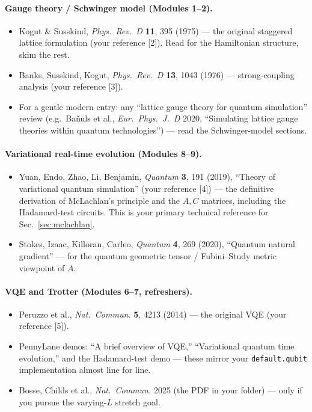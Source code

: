 \documentclass[11pt,a4paper]{article}
\begin{document}
\paragraph{Gauge theory / Schwinger model (Modules 1--2).}
\begin{itemize}[nosep,leftmargin=1.4em]
\item Kogut \& Susskind, \emph{Phys.\ Rev.\ D} \textbf{11}, 395 (1975) --- the original staggered
lattice formulation (your reference [2]). Read for the Hamiltonian structure, skim the rest.
\item Banks, Susskind, Kogut, \emph{Phys.\ Rev.\ D} \textbf{13}, 1043 (1976) --- strong-coupling
analysis (your reference [3]).
\item For a gentle modern entry: any ``lattice gauge theory for quantum simulation'' review (e.g.\
Ba\~nuls et al., \emph{Eur.\ Phys.\ J.\ D} 2020, ``Simulating lattice gauge theories within quantum
technologies'') --- read the Schwinger-model sections.
\end{itemize}

\paragraph{Variational real-time evolution (Modules 8--9).}
\begin{itemize}[nosep,leftmargin=1.4em]
\item Yuan, Endo, Zhao, Li, Benjamin, \emph{Quantum} \textbf{3}, 191 (2019), ``Theory of variational
quantum simulation'' (your reference [4]) --- the definitive derivation of McLachlan's principle and
the $A,C$ matrices, including the Hadamard-test circuits. This is your primary technical reference for
Sec.~\ref{sec:mclachlan}.
\item Stokes, Izaac, Killoran, Carleo, \emph{Quantum} \textbf{4}, 269 (2020), ``Quantum natural
gradient'' --- for the quantum geometric tensor / Fubini--Study metric viewpoint of $A$.
\end{itemize}

\paragraph{VQE and Trotter (Modules 6--7, refreshers).}
\begin{itemize}[nosep,leftmargin=1.4em]
\item Peruzzo et al., \emph{Nat.\ Commun.} \textbf{5}, 4213 (2014) --- the original VQE (your
reference [5]).
\item PennyLane demos: ``A brief overview of VQE,'' ``Variational quantum time evolution,'' and the
Hadamard-test demo --- these mirror your \texttt{default.qubit} implementation almost line for line.
\item Bosse, Childs et al., \emph{Nat.\ Commun.} 2025 (the PDF in your folder) --- only if you pursue
the varying-$L$ stretch goal.
\end{itemize}
\end{document}
